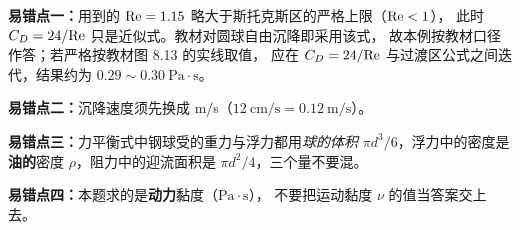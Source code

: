 \begin{yicuo}
\textbf{易错点一：}用到的 $\mathrm{Re}=1.15$ 略大于斯托克斯区的严格上限（$\mathrm{Re}<1$），
此时 $C_D=24/\mathrm{Re}$ 只是近似式。教材对圆球自由沉降即采用该式，
故本例按教材口径作答；若严格按教材图 8.13 的实线取值，
应在 $C_D=24/\mathrm{Re}$ 与过渡区公式之间迭代，结果约为 $0.29\sim0.30\ \mathrm{Pa\cdot s}$。

\textbf{易错点二：}沉降速度须先换成 m/s（$12\ \mathrm{cm/s}=0.12\ \mathrm{m/s}$）。

\textbf{易错点三：}力平衡式中钢球受的重力与浮力都用\emph{球的体积}
$\pi d^3/6$，浮力中的密度是\textbf{油的}密度 $\rho$，阻力中的迎流面积是
$\pi d^2/4$，三个量不要混。

\textbf{易错点四：}本题求的是\textbf{动力}黏度（$\mathrm{Pa\cdot s}$），
不要把运动黏度 $\nu$ 的值当答案交上去。
\end{yicuo}
